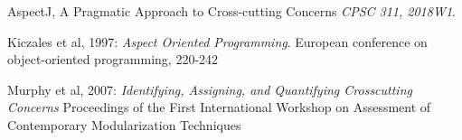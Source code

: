 \documentclass[sigconf]{acmart}
\begin{document}
\begin{thebibliography}{9}
AspectJ, A Pragmatic Approach to Cross-cutting Concerns
\textit{CPSC 311, 2018W1}. 

Kiczales et al, 1997: 
\textit{Aspect Oriented Programming}. 
European conference on object-oriented programming, 220-242

Murphy et al, 2007: 
\textit{Identifying, Assigning, and Quantifying Crosscutting Concerns}
Proceedings of the First International Workshop on Assessment of Contemporary Modularization Techniques

\end{thebibliography}
\end{document}

